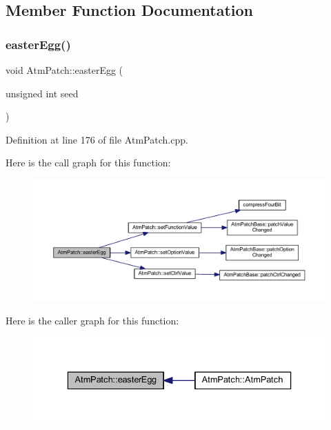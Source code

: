 \subsection{Member Function Documentation}
\mbox{\label{class_atm_patch_ad7a325c544381189f9419131feba685b}} 
\subsubsection{\texorpdfstring{easter\+Egg()}{easterEgg()}}
{\footnotesize\ttfamily void Atm\+Patch\+::easter\+Egg (\begin{DoxyParamCaption}\item[{unsigned int}]{seed }\end{DoxyParamCaption})}



Definition at line 176 of file Atm\+Patch.\+cpp.

Here is the call graph for this function\+:
\nopagebreak
\begin{figure}[H]
\begin{center}
\leavevmode
\includegraphics[width=350pt]{d9/de1/class_atm_patch_ad7a325c544381189f9419131feba685b_cgraph}
\end{center}
\end{figure}
Here is the caller graph for this function\+:
\nopagebreak
\begin{figure}[H]
\begin{center}
\leavevmode
\includegraphics[width=336pt]{d9/de1/class_atm_patch_ad7a325c544381189f9419131feba685b_icgraph}
\end{center}
\end{figure}
\mbox{\label{class_atm_patch_a5e8835fb80bdd1f130f129edde447d35}} 
